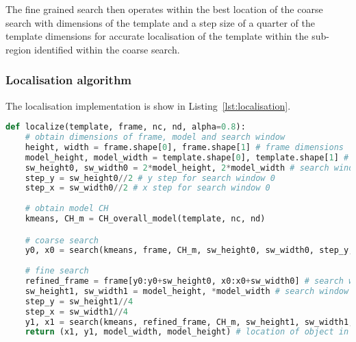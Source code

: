 The fine grained search then operates within the best location of the coarse
search with dimensions of the template and a step size of a quarter of the
template dimensions for accurate localisation of the template within the
sub-region identified within the coarse search.

\subsubsection{Localisation algorithm}
The localisation implementation is show in Listing~\ref{lst:localisation}.

\begin{lstlisting}[language=Python, caption={CCH detection localization algorithm}, captionpos=b, label={lst:localisation}]
def localize(template, frame, nc, nd, alpha=0.8):
    # obtain dimensions of frame, model and search window
    height, width = frame.shape[0], frame.shape[1] # frame dimensions
    model_height, model_width = template.shape[0], template.shape[1] # model dimensions
    sw_height0, sw_width0 = 2*model_height, 2*model_width # search window dimensions
    step_y = sw_height0//2 # y step for search window 0
    step_x = sw_width0//2 # x step for search window 0
    
    # obtain model CH
    kmeans, CH_m = CH_overall_model(template, nc, nd) 

    # coarse search
    y0, x0 = search(kmeans, frame, CH_m, sw_height0, sw_width0, step_y, step_x, nc, nd, alpha) 
    
    # fine search
    refined_frame = frame[y0:y0+sw_height0, x0:x0+sw_width0] # search within best coarse result
    sw_height1, sw_width1 = model_height, *model_width # search window dimensions
    step_y = sw_height1//4
    step_x = sw_width1//4
    y1, x1 = search(kmeans, refined_frame, CH_m, sw_height1, sw_width1, step_y, step_x, nc, nd, alpha)  
    return (x1, y1, model_width, model_height) # location of object in frame
\end{lstlisting}

